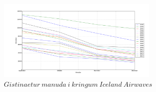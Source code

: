 \documentclass[11pt,a4paper]{amsart}
\theoremstyle{plain}
\theoremstyle{definition}
\theoremstyle{remark}
\begin{document}
\begin{figure}[H]
\centering
\includegraphics[height=40mm]{my_plot.png}
\caption{$ Gistinaetur\ manuda\ i\ kringum\ Iceland\ Airwaves $\label{fig:gist_hlutf}}
\end{figure}
	
{}

\end{document}
